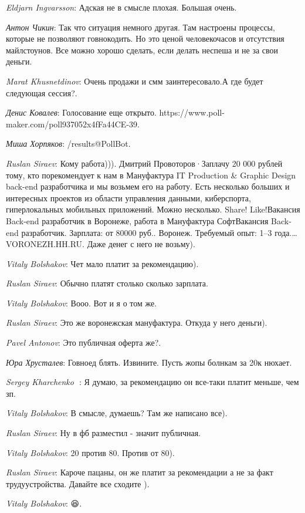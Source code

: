 \documentclass[10pt]{book}
\newcommand{\AUTHOR}[1]{\emph{#1}:}
\begin{document}
\AUTHOR{Eldjarn Ingvarsson} Адская не в смысле плохая. Большая очень.

\AUTHOR{Антон Чикин} Так что ситуация немного другая. Там настроены процессы, которые не позволяют говнокодить. Но это ценой человекочасов и отсутствия майлстоунов. Все можно хорошо сделать, если делать неспеша и не за свои деньги.

\AUTHOR{Marat Khusnetdinov} Очень продажи и смм заинтересовало.А где будет следующая сессия?.

\AUTHOR{Денис Ковалев} Голосование еще открыто. https://www.poll-maker.com/poll937052x4fFa44CE-39.

\AUTHOR{Миша Хорпяков} /results@PollBot.

\AUTHOR{Ruslan Siraev} Кому работа))). Дмитрий Провоторов·Заплачу 20 000 рублей тому, кто порекомендует к нам в Мануфактура IT Production & Graphic Design back-end разработчика и мы возьмем его на работу. Есть несколько больших и интересных проектов из области управления данными, киберспорта, гиперлокальных мобильных приложений. Можно несколько. Share! Like!Вакансия Back-end разработчик в Воронеже, работа в Мануфактура СофтВакансия Back-end разработчик. Зарплата: от 80000 руб.. Воронеж. Требуемый опыт: 1–3 года.…VORONEZH.HH.RU. Даже денег с него не возьму).

\AUTHOR{Vitaly Bolshakov} Чет мало платит за рекомендацию).

\AUTHOR{Ruslan Siraev} Обычно платят столько сколько зарплата.

\AUTHOR{Vitaly Bolshakov} Вооо. Вот и я о том же.

\AUTHOR{Ruslan Siraev} Это же воронежская мануфактура. Откуда у него деньги).

\AUTHOR{Pavel Antonov} Это публичная оферта же?.

\AUTHOR{Юра Хрусталев} Говноед блять. Извините. Пусть жопы болнкам за 20к нюхает.

\AUTHOR{Sergey Kharchenko 🦁} Я думаю, за рекомендацию он все-таки платит меньше, чем зп.

\AUTHOR{Vitaly Bolshakov} В смысле, думаешь? Там же написано все).

\AUTHOR{Ruslan Siraev} Ну в фб разместил - значит публичная.

\AUTHOR{Vitaly Bolshakov} 20 против 80. Против от 80).

\AUTHOR{Ruslan Siraev} Кароче пацаны, он же платит за рекомендации а не за факт трудуустройства. Давайте все сходите ).

\AUTHOR{Vitaly Bolshakov} 😆.
\end{document}
